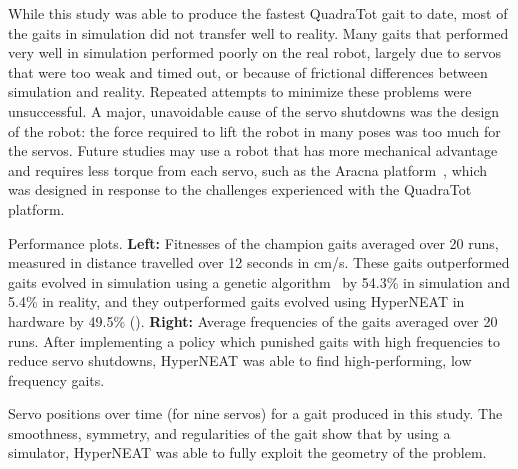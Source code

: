 While this study was able to produce the fastest QuadraTot gait to
date, most of the gaits in simulation did not transfer well to
reality. Many gaits that performed very well in simulation performed
poorly on the real robot, largely due to servos that were too weak and
timed out, or because of frictional differences between simulation and
reality. Repeated attempts to minimize these problems were
unsuccessful.  A major, unavoidable cause of the servo shutdowns was
the design of the robot: the force required to lift the robot in many
poses was too much for the servos. Future studies may use a
robot that has more mechanical advantage and requires less torque from
each servo, such as the Aracna platform~\cite{lohmann2012aracna},
which was designed in response to the challenges experienced with the
QuadraTot platform.


{Performance plots. \textbf{Left: }Fitnesses of the champion gaits
averaged over 20 runs, measured in distance travelled over 12 seconds
in cm/s. These gaits outperformed gaits evolved in simulation using a
genetic algorithm~\cite{glette} by 54.3\% in simulation and 5.4\% in
reality, and they outperformed gaits evolved using HyperNEAT in
hardware by 49.5\% (). \textbf{Right: }Average frequencies of
the gaits averaged over 20 runs. After implementing a policy which
punished gaits with high frequencies to reduce servo shutdowns,
HyperNEAT was able to find high-performing, low frequency
gaits. }


{Servo positions over time (for nine servos) for a gait produced in
this study. The smoothness, symmetry, and regularities of the gait
show that by using a simulator, HyperNEAT was able to fully exploit
the geometry of the problem.}



